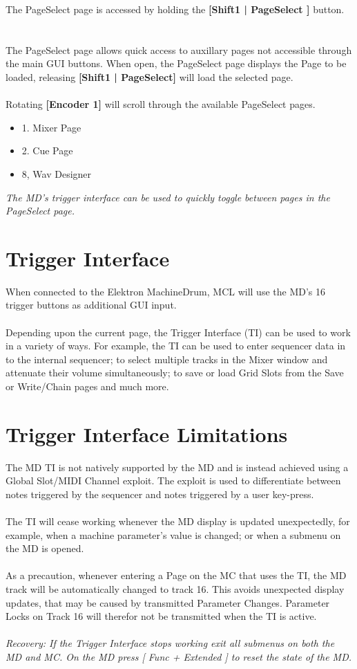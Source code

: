 The PageSelect page is accessed by holding the \textbf{[Shift1 | PageSelect ]} button.
\\
\\
\\
The PageSelect page allows quick access to auxillary pages not accessible through the main GUI buttons.
When open, the PageSelect page displays the Page to be loaded, releasing \textbf{[Shift1 | PageSelect]} will load
the selected page.
\\
\\Rotating \textbf{[Encoder 1]} will scroll through the available PageSelect pages.
\begin{itemize}
	\item{1. Mixer Page}
	\item{2. Cue Page}
    \item{8, Wav Designer}
\end{itemize}
\textit{The MD's trigger interface can be used to quickly toggle between pages in the PageSelect page. }
\section{Trigger Interface}
When connected to the Elektron MachineDrum, MCL will use the MD's 16 trigger buttons as additional GUI input. \\
\\
Depending upon the current page, the Trigger Interface (TI) can be used to work in a variety of ways.
For example, the TI can be used to enter sequencer data in to the internal sequencer;
to select multiple tracks in the Mixer window and attenuate their volume simultaneously; to save or load Grid Slots from the Save or Write/Chain pages and much more.

\section{Trigger Interface Limitations}
The MD TI is not natively supported by the MD and is instead achieved using a Global Slot/MIDI Channel exploit. The exploit is used to differentiate between notes triggered by the sequencer and notes triggered by a user key-press.\\
\\
The TI will cease working whenever the MD display is updated unexpectedly, for example, when a machine parameter's value is changed; or when a submenu on the MD is opened.\\
\\
As a precaution, whenever entering a Page on the MC that uses the TI, the MD track will be automatically changed to track 16. This avoids unexpected display updates, that may be caused 
by transmitted Parameter Changes. Parameter Locks on Track 16 will therefor not be transmitted when the TI is active.\\
\\
\textit{Recovery: If the Trigger Interface stops working exit all submenus on both the MD and MC. On the MD press [ Func + Extended ] to reset the state of the MD.}





